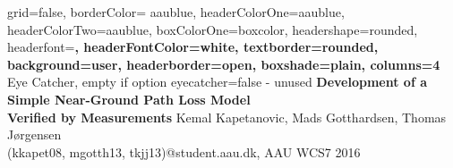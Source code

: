 \documentclass[a0paper,landscape]{baposter}
\begin{document}

\background{
}
\begin{poster}{
	grid=false,
	borderColor= aaublue,
	headerColorOne=aaublue,
	headerColorTwo=aaublue,
	boxColorOne=boxcolor,
	headershape=rounded,
	headerfont=\Large\sf\bf,
	headerFontColor=white,
	textborder=rounded,
	background=user,
	headerborder=open,
  	boxshade=plain,
  	columns=4
}
{
	Eye Catcher, empty if option eyecatcher=false - unused
}
{\sf\bf
	\hspace{-2.2em}Development of a Simple Near-Ground Path Loss Model \\Verified by Measurements
}
{
	 Kemal Kapetanovic, Mads Gotthardsen, Thomas Jørgensen \\
	\smaller(kkapet08, mgotth13, tkjj13)@student.aau.dk, AAU WCS7 2016
}
{
\setlength\fboxsep{0pt}
\setlength\fboxrule{0pt}
}


\end{poster}
\end{document}
